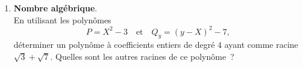 \begin{enumerate}
\item \textbf{Nombre algébrique}. \\
En utilisant les polynômes
\[ P=X^2-3 \quad \text{et} \quad Q_y = (y-X)^2-7,\]
déterminer un polynôme à coefficients entiers de degré $4$ ayant comme racine $\sqrt{3}+\sqrt{7}$. Quelles sont les autres racines de ce polynôme~?
\end{enumerate}

